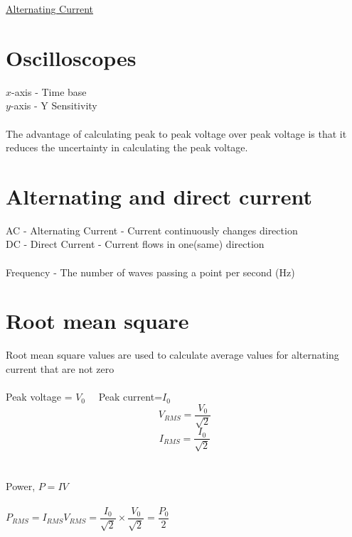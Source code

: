 \documentclass{article}[18pt]
\begin{document}
\begin{center}
\underline{\huge Alternating Current}
\end{center}
\section{Oscilloscopes}
$x$-axis - Time base\\
$y$-axis - Y Sensitivity\\
\\
The advantage of calculating peak to peak voltage over peak voltage is that it reduces the uncertainty in calculating the peak voltage.

\section{Alternating and direct current}
AC - Alternating Current - Current continuously changes direction\\
DC - Direct Current - Current flows in one(same) direction\\
\\
Frequency - The number of waves passing a point per second (Hz)\\
\section{Root mean square}
Root mean square values are used to calculate average values for alternating current that are not zero\\
\\
Peak voltage = $V_0 \quad$ Peak current=$I_0$\\
$$V_{RMS}=\dfrac{V_0}{\sqrt{2}}$$
$$I_{RMS}=\dfrac{I_0}{\sqrt{2}}$$\\
\\
Power, $P=IV$\\
\\
$P_{RMS}=I_{RMS}V_{RMS}=\dfrac{I_0}{\sqrt{2}}\times\dfrac{V_0}{\sqrt{2}}=\dfrac{P_0}{2}$
 
\end{document}
